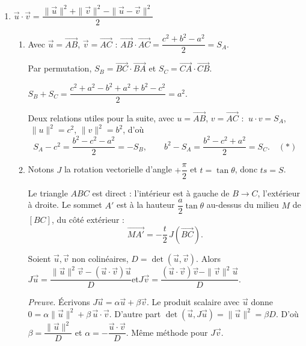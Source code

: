 \begin{enumerate}[itemsep=14pt]
  \item\leavevmode
  \begin{prop}
  \textbf{$\overrightarrow{u}\cdot\overrightarrow{v}=\dfrac{\|\overrightarrow{u}\|^2+\|\overrightarrow{v}\|^2-\|\overrightarrow{u}-\overrightarrow{v}\|^2}{2}$}
  \end{prop}
  \begin{enumerate}[itemsep=8pt]
    \item Avec $\overrightarrow{u}=\overrightarrow{AB}$, $\overrightarrow{v}=\overrightarrow{AC}$ : $\overrightarrow{AB}\cdot\overrightarrow{AC}=\dfrac{c^2+b^2-a^2}2=S_A$.

    Par permutation, $S_B=\overrightarrow{BC}\cdot\overrightarrow{BA}$ et $S_C=\overrightarrow{CA}\cdot\overrightarrow{CB}$.

    $S_B+S_C=\dfrac{c^2+a^2-b^2+a^2+b^2-c^2}{2}=a^2$.

    Deux relations utiles pour la suite, avec $u=\overrightarrow{AB}$, $v=\overrightarrow{AC}$ : $\ u\cdot v=S_A$, $\ \|u\|^2=c^2$, $\|v\|^2=b^2$, d'où
    \[S_A-c^2=\dfrac{b^2-c^2-a^2}{2}=-S_B,\qquad b^2-S_A=\dfrac{b^2-c^2+a^2}{2}=S_C.\quad(\ast)\]

    \item Notons $J$ la rotation vectorielle d'angle $+\dfrac\pi2$ et $t=\tan\theta$, donc $ts=S$.

    Le triangle $ABC$ est direct : l'intérieur est à gauche de $B\to C$, l'extérieur à droite. Le sommet $A'$ est à la hauteur $\dfrac a2\tan\theta$ au-dessus du milieu $M$ de $[BC]$, du côté extérieur :
    \[\overrightarrow{MA'}=-\dfrac t2\,J\left(\overrightarrow{BC}\right).\]

    \begin{prop}
    Soient $\overrightarrow{u},\overrightarrow{v}$ non colinéaires, $D=\det(\overrightarrow{u},\overrightarrow{v})$. Alors
    \textbf{$J\overrightarrow{u}=\dfrac{\|\overrightarrow{u}\|^2\overrightarrow{v}-(\overrightarrow{u}\cdot\overrightarrow{v})\overrightarrow{u}}{D}$}\quad et\quad \textbf{$J\overrightarrow{v}=\dfrac{(\overrightarrow{u}\cdot\overrightarrow{v})\overrightarrow{v}-\|\overrightarrow{v}\|^2\overrightarrow{u}}{D}$}.
    \end{prop}
    \emph{Preuve.} Écrivons $J\overrightarrow{u}=\alpha\overrightarrow{u}+\beta\overrightarrow{v}$. Le produit scalaire avec $\overrightarrow{u}$ donne $0=\alpha\|\overrightarrow{u}\|^2+\beta\,\overrightarrow{u}\cdot\overrightarrow{v}$. D'autre part $\det(\overrightarrow{u},J\overrightarrow{u})=\|\overrightarrow{u}\|^2=\beta D$. D'où $\beta=\dfrac{\|\overrightarrow{u}\|^2}{D}$ et $\alpha=-\dfrac{\overrightarrow{u}\cdot\overrightarrow{v}}{D}$. Même méthode pour $J\overrightarrow{v}$.


\end{enumerate}
\end{enumerate}
